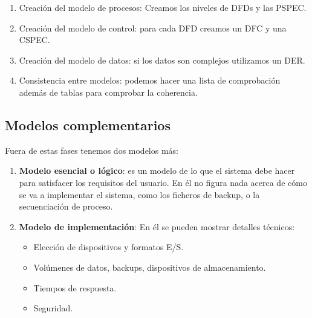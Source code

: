 \begin{enumerate}
    \item Creación del modelo de procesos: Creamos los niveles de DFDs y las PSPEC.
    \item Creación del modelo de control: para cada DFD creamos un DFC y una CSPEC.
    \item Creación del modelo de datos: si los datos son complejos utilizamos un DER.
    \item Consistencia entre modelos: podemos hacer una lista de comprobación además de tablas para comprobar la coherencia.
\end{enumerate}

\subsection{Modelos complementarios}
Fuera de estas fases tenemos dos modelos más: %
\begin{enumerate}
    \item \textbf{Modelo esencial o lógico}: es un modelo de lo que el sistema debe hacer para satisfacer los requisitos del usuario. En él no figura nada acerca de cómo se va a implementar el sistema, como los ficheros de backup, o la secuenciación de proceso.
    \item \textbf{Modelo de implementación}: En él se pueden mostrar detalles técnicos:
          \begin{itemize}
              \item Elección de dispositivos y formatos E/S.
              \item Volúmenes de datos, backups, dispositivos de almacenamiento.
              \item Tiempos de respuesta.
              \item Seguridad.
          \end{itemize}
\end{enumerate}

